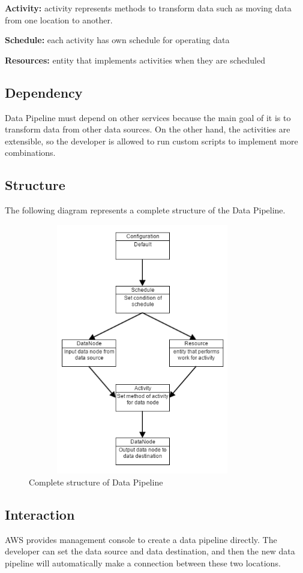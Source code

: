      \noindent\textbf{Activity:} activity represents methods to transform data such as moving data from one location to another. 
     
     \noindent\textbf{Schedule:} each activity has own schedule for operating data
     
     \noindent\textbf{Resources:} entity that implements activities when they are scheduled 
     
	\subsection{Dependency}
	Data Pipeline must depend on other services because the main goal of it is to transform data from other data sources. On the other hand, the activities are extensible, so the developer is allowed to run custom scripts to implement more combinations.
     
    \subsection{Structure}
	The following diagram represents a complete structure of the Data Pipeline. 

    \begin{figure}[h]
        \includegraphics[width=10cm, height=11cm]{data_pipeline.png}
        \centering
        \caption{Complete structure of Data Pipeline}
    \end{figure}
    
	\subsection{Interaction}
	AWS provides management console to create a data pipeline directly. The developer can set the data source and data destination, and then the new data pipeline will automatically make  a connection between these two locations.  
    
